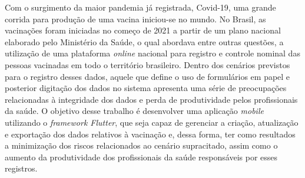 %
%


Com o surgimento da maior pandemia já registrada, Covid-19, uma grande corrida para produção de uma vacina iniciou-se no mundo. No Brasil, as vacinações foram iniciadas no começo de 2021 a partir de um plano nacional elaborado pelo Ministério da Saúde, o qual abordava entre outras questões, a utilização de uma plataforma \textit{online} nacional para registro e controle nominal das pessoas vacinadas em todo o território brasileiro. Dentro dos cenários previstos para o registro desses dados, aquele que define o uso de formulários em papel e posterior digitação dos dados no sistema apresenta uma série de preocupações relacionadas à integridade dos dados e perda de produtividade pelos profissionais da saúde. O objetivo desse trabalho é desenvolver uma aplicação \textit{mobile} utilizando o \textit{framework Flutter}, que seja capaz de gerenciar a criação, atualização e exportação dos dados relativos à vacinação e, dessa forma, ter como resultados a minimização dos riscos relacionados ao cenário supracitado, assim como o aumento da produtividade dos profissionais da saúde responsáveis por esses registros.

